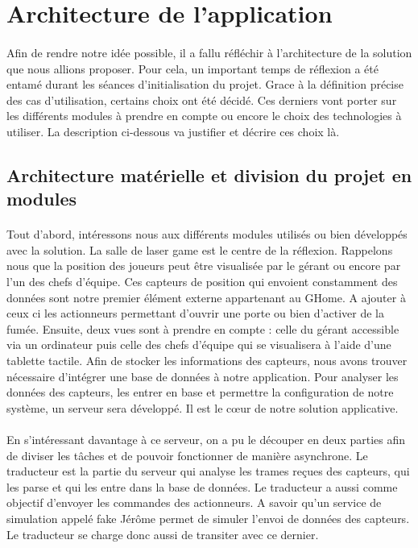 \section{Architecture de l'application}

\paragraph{}
Afin de rendre notre idée possible, il a fallu réfléchir à l'architecture de la solution que nous allions proposer. Pour cela, un important temps de réflexion a été entamé durant les séances d'initialisation du projet. Grace à la définition précise des cas d'utilisation, certains choix ont été décidé. Ces derniers vont porter sur les différents modules à prendre en compte ou encore le choix des technologies à utiliser. La description ci-dessous va justifier et décrire ces choix là.

\subsection{Architecture matérielle et division du projet en modules}

\paragraph{}
Tout d'abord, intéressons nous aux différents modules utilisés ou bien développés avec la solution. La salle de laser game est le centre de la réflexion. Rappelons nous que la position des joueurs peut être visualisée par le gérant ou encore par l'un des chefs d'équipe. Ces capteurs de position qui envoient constamment des données sont notre premier élément externe appartenant au GHome. A ajouter à ceux ci les actionneurs permettant d'ouvrir une porte ou bien d'activer de la fumée. Ensuite, deux vues sont à prendre en compte : celle du gérant accessible via un ordinateur puis celle des chefs d'équipe qui se visualisera à l'aide d'une tablette tactile. Afin de stocker les informations des capteurs, nous avons trouver nécessaire d'intégrer une base de données à notre application. Pour analyser les données des capteurs, les entrer en base et permettre la configuration de notre système, un serveur sera développé. Il est le cœur de notre solution applicative.

\paragraph{}
En s'intéressant davantage à ce serveur, on a pu le découper en deux parties afin de diviser les tâches et de pouvoir fonctionner de manière asynchrone. Le traducteur est la partie du serveur qui analyse les trames reçues des capteurs, qui les parse et qui les entre dans la base de données. Le traducteur a aussi comme objectif d'envoyer les commandes des actionneurs. A savoir qu'un service de simulation appelé fake Jérôme permet de simuler l'envoi de données des capteurs. Le traducteur se charge donc aussi de transiter avec ce dernier.

